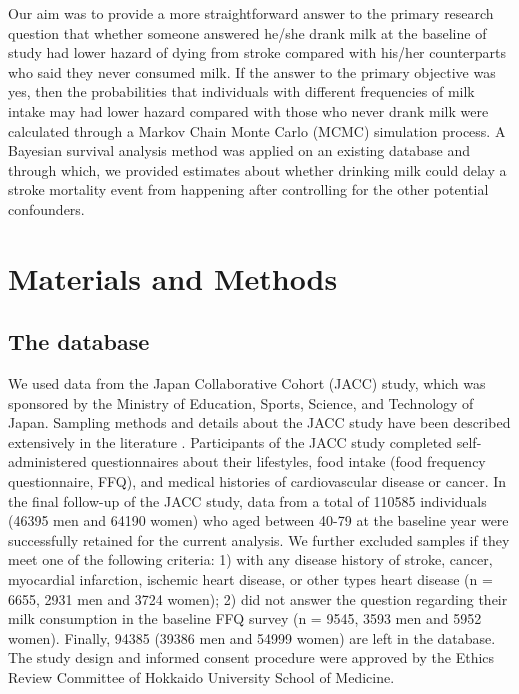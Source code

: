 \documentclass[nutrients,article,submitted,moreauthors,pdftex]{mdpi}
\begin{document}
Our aim was to provide a more straightforward answer to the primary
research question that whether someone answered he/she drank milk at the
baseline of study had lower hazard of dying from stroke compared with
his/her counterparts who said they never consumed milk. If the answer to
the primary objective was yes, then the probabilities that individuals
with different frequencies of milk intake may had lower hazard compared
with those who never drank milk were calculated through a Markov Chain
Monte Carlo (MCMC) simulation process. A Bayesian survival analysis
method was applied on an existing database and through which, we
provided estimates about whether drinking milk could delay a stroke
mortality event from happening after controlling for the other potential
confounders.

\hypertarget{materials-and-methods}{%
\section{Materials and Methods}\label{materials-and-methods}}

\hypertarget{the-database}{%
\subsection{The database}\label{the-database}}

We used data from the Japan Collaborative Cohort (JACC) study, which was
sponsored by the Ministry of Education, Sports, Science, and Technology
of Japan. Sampling methods and details about the JACC study have been
described extensively in the literature
\citep{Ohno2001, Tamakoshi2005, Tamakoshi2013}. Participants of the JACC
study completed self-administered questionnaires about their lifestyles,
food intake (food frequency questionnaire, FFQ), and medical histories
of cardiovascular disease or cancer. In the final follow-up of the JACC
study, data from a total of 110585 individuals (46395 men and 64190
women) who aged between 40-79 at the baseline year were successfully
retained for the current analysis. We further excluded samples if they
meet one of the following criteria: 1) with any disease history of
stroke, cancer, myocardial infarction, ischemic heart disease, or other
types heart disease (n = 6655, 2931 men and 3724 women); 2) did not
answer the question regarding their milk consumption in the baseline FFQ
survey (n = 9545, 3593 men and 5952 women). Finally, 94385 (39386 men
and 54999 women) are left in the database. The study design and informed
consent procedure were approved by the Ethics Review Committee of
Hokkaido University School of Medicine.
\end{document}

